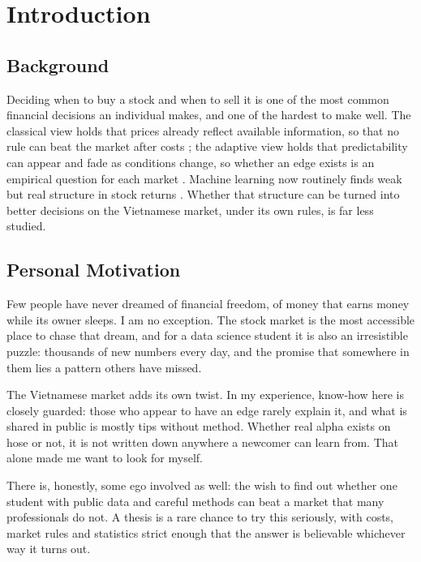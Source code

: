 \chapter{Introduction}
\label{ch:introduction}

\section{Background}

Deciding when to buy a stock and when to sell it is one of the most common financial decisions
an individual makes, and one of the hardest to make well. The classical view holds that prices
already reflect available information, so that no rule can beat the market after costs
\citep{fama1970efficient}; the adaptive view holds that predictability can appear and fade as
conditions change, so whether an edge exists is an empirical question for each market
\citep{lo2004adaptive}. Machine learning now routinely finds weak but real structure in stock
returns \citep{krauss2017deep,gu2020empirical}. Whether that structure can be turned into
better decisions on the Vietnamese market, under its own rules, is far less studied.

\section{Personal Motivation}

Few people have never dreamed of financial freedom, of money that earns money while its owner
sleeps. I am no exception. The stock market is the most accessible place to chase that dream,
and for a data science student it is also an irresistible puzzle: thousands of new numbers
every day, and the promise that somewhere in them lies a pattern others have missed.

The Vietnamese market adds its own twist. In my experience, know-how here is closely guarded:
those who appear to have an edge rarely explain it, and what is shared in public is mostly tips
without method. Whether real alpha exists on \gls{hose} or not, it is not written down anywhere a
newcomer can learn from. That alone made me want to look for myself.

There is, honestly, some ego involved as well: the wish to find out whether one student with
public data and careful methods can beat a market that many professionals do not. A thesis is a
rare chance to try this seriously, with costs, market rules and statistics strict enough that
the answer is believable whichever way it turns out.

